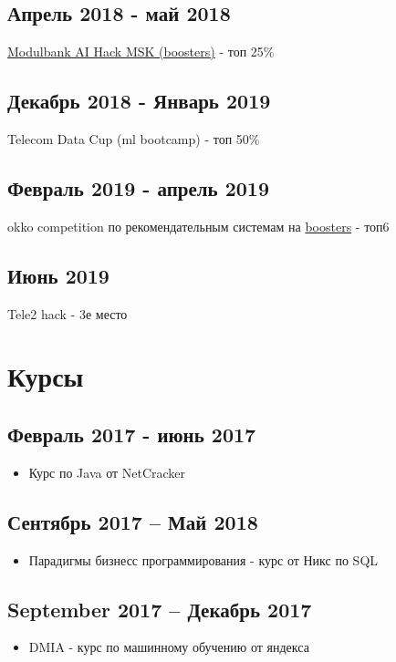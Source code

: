 \documentclass[11pt]{article}
\begin{document}
\subsection{Апрель 2018 - май 2018}
\label{sec:org20d0c77}
\href{https://boosters.pro/championship/modulbank1}{Modulbank AI Hack MSK (boosters)} - топ 25\%
\subsection{Декабрь 2018 - Январь 2019}
\label{sec:orgb32b996}
Telecom Data Cup (ml bootcamp) - топ 50\%
\subsection{Февраль 2019 - апрель 2019}
\label{sec:orgb6a52ae}
okko competition по рекомендательным системам на \href{http://\\boosters.pro}{boosters} - топ6
\subsection{Июнь 2019}
\label{sec:org9b5a687}
Tele2 hack - 3е место
\section{Курсы}
\label{sec:orgfe4791a}
\subsection{Февраль 2017 - июнь 2017}
\label{sec:orgfcb725d}
\begin{itemize}
\item Курс по Java от NetCracker
\end{itemize}
\subsection{Сентябрь 2017 – Май 2018}
\label{sec:orga5d05fc}
\begin{itemize}
\item Парадигмы бизнесс программирования - курс от Никс по SQL
\end{itemize}
\subsection{September 2017 – Декабрь 2017}
\label{sec:org5eefe67}
\begin{itemize}
\item DMIA - курс по машинному обучению от яндекса
\end{itemize}
\end{document}
